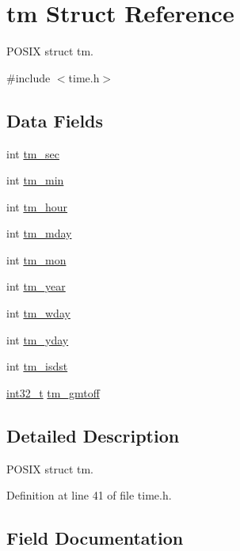 \hypertarget{structtm}{}\section{tm Struct Reference}
\label{structtm}


P\+O\+S\+IX struct tm.  




{\ttfamily \#include $<$time.\+h$>$}

\subsection*{Data Fields}
\begin{DoxyCompactItemize}
\item 
int \hyperlink{structtm_a4d098a9a5c03a00b2ee61e10851de81e}{tm\+\_\+sec}
\item 
int \hyperlink{structtm_af414eb7c86cc3099595211eee4d4211b}{tm\+\_\+min}
\item 
int \hyperlink{structtm_a3e7ca4e37f1abcaf56b8a916c38eb9fe}{tm\+\_\+hour}
\item 
int \hyperlink{structtm_ab8d8904bad43b0c8b96e61941c5b5310}{tm\+\_\+mday}
\item 
int \hyperlink{structtm_a112ac36fa2f593777138a417cf031e17}{tm\+\_\+mon}
\item 
int \hyperlink{structtm_a33adf78fd6476b2120ce3b9c4a852053}{tm\+\_\+year}
\item 
int \hyperlink{structtm_afe81a8c46f1c693c43f259b288859f4f}{tm\+\_\+wday}
\item 
int \hyperlink{structtm_a93a0ba77cc23796df84405dcbcc57eb1}{tm\+\_\+yday}
\item 
int \hyperlink{structtm_a5645ca0580c8ab2c24f6c2965d9c9f9c}{tm\+\_\+isdst}
\item 
\hyperlink{earth2wireframe_8c_a32f2e37ee053cf2ce8ca28d1f74630e5}{int32\+\_\+t} \hyperlink{structtm_a6b7d1fb16f21197ea027e364e2812c3d}{tm\+\_\+gmtoff}
\end{DoxyCompactItemize}


\subsection{Detailed Description}
P\+O\+S\+IX struct tm. 

Definition at line 41 of file time.\+h.



\subsection{Field Documentation}

